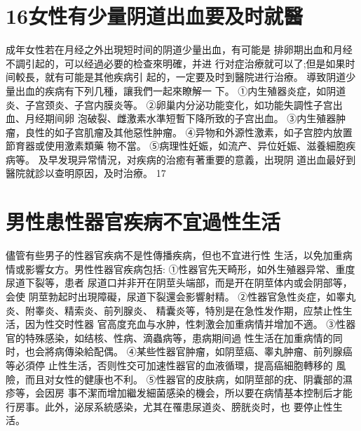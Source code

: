 \documentclass[12pt,UTF8]{ctexbook}
\begin{document}
\section{16女性有少量阴道出血要及时就醫}
成年女性若在月经之外出現短时间的阴道少量出血，有可能是
排卵期出血和月经不調引起的，可以经過必要的检查來明確，并进
行对症治療就可以了;但是如果时间較長，就有可能是其他疾病引
起的，一定要及时到醫院进行治療。
導致阴道少量出血的疾病有下列几種，讓我們一起來瞭解一
下。
①内生殖器炎症，如阴道炎、子宫颈炎、子宫内膜炎等。
②卵巢内分泌功能变化，如功能失調性子宫出血、月经期间卵
泡破裂、雌激素水準短暫下降所致的子宫出血。
③内生殖器肿瘤，良性的如子宫肌瘤及其他惡性肿瘤。
④异物和外源性激素，如子宫腔内放置節育器或使用激素類藥
物不當。
⑤病理性妊娠，如流产、异位妊娠、滋養細胞疾病等。
及早发現异常情況，对疾病的治癒有著重要的意義，出現阴
道出血最好到醫院就診以查明原因，及时治療。
17
\section{男性患性器官疾病不宜過性生活}
儘管有些男子的性器官疾病不是性傳播疾病，但也不宜进行性
生活，以免加重病情或影響女方。男性性器官疾病包括:
①性器官先天畸形，如外生殖器异常、重度尿道下裂等，患者
尿道口并非开在阴莖头端部，而是开在阴莖体内或会阴部等，会使
阴莖勃起时出現障礙，尿道下裂還会影響射精。
②性器官急性炎症，如睾丸炎、附睾炎、精索炎、前列腺炎、
精囊炎等，特別是在急性发作期，应禁止性生活，因为性交时性器
官高度充血与水肿，性刺激会加重病情并增加不適。
③性器官的特殊感染，如结核、性病、滴蟲病等，患病期间過
性生活在加重病情的同时，也会將病傳染給配偶。
④某些性器官肿瘤，如阴莖癌、睾丸肿瘤、前列腺癌等必須停
止性生活，否则性交可加速性器官的血液循環，提高癌細胞轉移的
風險，而且对女性的健康也不利。
⑤性器官的皮肤病，如阴莖部的疣、阴囊部的濕疹等，会因房
事不潔而增加繼发細菌感染的機会，所以要在病情基本控制后才能
行房事。此外，泌尿系統感染，尤其在罹患尿道炎、膀胱炎时，也
要停止性生活。
\end{document}
